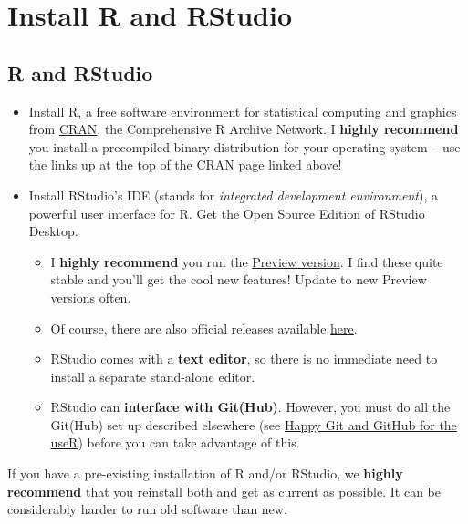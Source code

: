 \documentclass[
]{book}
\providecommand{\tightlist}{%
  \setlength{\itemsep}{0pt}\setlength{\parskip}{0pt}}
\begin{document}
\hypertarget{install}{%
\chapter{Install R and RStudio}\label{install}}

\hypertarget{r-and-rstudio}{%
\section{R and RStudio}\label{r-and-rstudio}}

\begin{itemize}
\item
  Install \href{https://www.r-project.org}{R, a free software environment for statistical computing and graphics} from \href{https://cloud.r-project.org}{CRAN}, the Comprehensive R Archive Network. I \textbf{highly recommend} you install a precompiled binary distribution for your operating system -- use the links up at the top of the CRAN page linked above!
\item
  Install RStudio's IDE (stands for \emph{integrated development environment}), a powerful user interface for R. Get the Open Source Edition of RStudio Desktop.

  \begin{itemize}
  \tightlist
  \item
    I \textbf{highly recommend} you run the \href{https://www.rstudio.com/products/rstudio/download/preview/}{Preview version}. I find these quite stable and you'll get the cool new features! Update to new Preview versions often.
  \item
    Of course, there are also official releases available \href{https://www.rstudio.com/products/rstudio/\#Desktop}{here}.
  \item
    RStudio comes with a \textbf{text editor}, so there is no immediate need to install a separate stand-alone editor.
  \item
    RStudio can \textbf{interface with Git(Hub)}. However, you must do all the Git(Hub) set up described elsewhere (see \href{https://happygitwithr.com}{Happy Git and GitHub for the useR}) before you can take advantage of this.
  \end{itemize}
\end{itemize}

If you have a pre-existing installation of R and/or RStudio, we \textbf{highly recommend} that you reinstall both and get as current as possible. It can be considerably harder to run old software than new.
\end{document}
